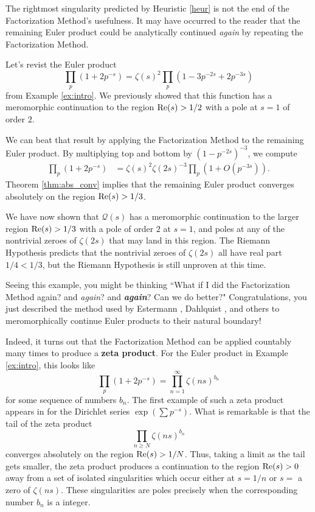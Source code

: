 \documentclass[12pt]{amsart}
\newenvironment{BOXexample}{
\begin{exbox}\mbox{}
\begin{example}
}
{
\end{example}
\end{exbox}
}
\theoremstyle{plain}
\begin{document}
The rightmost singularity predicted by Heuristic \ref{heur} is not the end of the Factorization Method's usefulness. It may have occurred to the reader that the remaining Euler product could be analytically continued \emph{again} by repeating the Factorization Method.

\begin{BOXexample}
    Let's revist the Euler product
    \[
    \prod_p (1 + 2p^{-s}) = \zeta(s)^2 \prod_p(1 - 3p^{-2s} + 2p^{-3s})
    \]
    from Example \ref{ex:intro}. We previously showed that this function has a meromorphic continuation to the region ${\rm Re}(s) > 1/2$ with a pole at $s=1$ of order $2$.

    We can beat that result by applying the Factorization Method to the remaining Euler product. By multiplying top and bottom by $(1 - p^{-2s})^{-3}$, we compute
    \begin{align*}
        \prod_p (1 + 2p^{-s}) &= \zeta(s)^2\zeta(2s)^{-3}\prod_p\left(1 + O(p^{-3s})\right).
    \end{align*}
    Theorem \ref{thm:abs_conv} implies that the remaining Euler product converges absolutely on the region ${\rm Re}(s) > 1/3$.

    We have now shown that $\mathcal{Q}(s)$ has a meromorphic continuation to the larger region ${\rm Re}(s) > 1/3$ with a pole of order $2$ at $s=1$, and poles at any of the nontrivial zeroes of $\zeta(2s)$ that may land in this region. The Riemann Hypothesis predicts that the nontrivial zeroes of $\zeta(2s)$ all have real part $1/4 < 1/3$, but the Riemann Hypothesis is still unproven at this time.
\end{BOXexample}

Seeing this example, you might be thinking ``What if I did the Factorization Method again? and \emph{again}? and \textbf{\emph{again}}? Can we do better?" Congratulations, you just described the method used by Estermann \cite{estermann_1928}, Dahlquist \cite{dahlquist_1952}, and others \cite{kurokawa_1978,kurokawa_1986I,kurokawa_1986II,moroz_1988} to meromorphically continue Euler products to their natural boundary!

Indeed, it turns out that the Factorization Method can be applied countably many times to produce a \textbf{zeta product}. For the Euler product in Example \ref{ex:intro}, this looks like
\[
\prod_p (1 + 2p^{-s}) = \prod_{n=1}^{\infty} \zeta(ns)^{b_n}
\]
for some sequence of numbers $b_n$. The first example of such a zeta product appears in \cite{landau_walfisz_1920} for the Dirichlet series $\exp(\sum p^{-s})$. What is remarkable is that the tail of the zeta product
\[
\prod_{n\ge N} \zeta(ns)^{b_n}
\]
converges absolutely on the region ${\rm Re}(s) > 1/N$. Thus, taking a limit as the tail gets smaller, the zeta product produces a continuation to the region ${\rm Re}(s) > 0$ away from a set of isolated singularities which occur either at $s=1/n$ or $s=$ a zero of $\zeta(ns)$. These singularities are poles precisely when the corresponding number $b_n$ is a integer.
\end{document}
